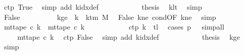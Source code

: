 \begin{isabellebody}
\ c{}{\isacharunderscore}{\kern0pt}tp\ True\ \isamarkupfalse%
\ {\isacharparenleft}{\kern0pt}simp\ add{\isacharcolon}{\kern0pt}\ k{\isacharunderscore}{\kern0pt}idx{\isacharunderscore}{\kern0pt}def{\isacharparenright}{\kern0pt}\isanewline
\ \ \ \ \ \ \ \ \isamarkupfalse%
\ \isamarkupfalse%
\ {\isacharquery}{\kern0pt}thesis\ \isamarkupfalse%
\ klt\ \isamarkupfalse%
\ simp\isanewline
\ \ \ \ \ \ \isamarkupfalse%
\isanewline
\ \ \ \ \ \ \ \ \isamarkupfalse%
\ False\isanewline
\ \ \ \ \ \ \ \ \isamarkupfalse%
\ kge{\isacharcolon}{\kern0pt}\ {\isachardoublequoteopen}{\isasymnot}\ k\ {\isacharless}{\kern0pt}\ k{\isacharunderscore}{\kern0pt}tm\ M{\isachardoublequoteclose}\ \isamarkupfalse%
\ False\ kne\ cond{\isacharbrackleft}{\kern0pt}OF\ kne{\isacharbrackright}{\kern0pt}\ \isamarkupfalse%
\ simp\isanewline
\ \ \ \ \ \ \ \ \isamarkupfalse%
\ {\isachardoublequoteopen}mt{\isacharunderscore}{\kern0pt}tape\ c{}\ k\ {\isacharequal}{\kern0pt}\ mt{\isacharunderscore}{\kern0pt}tape\ c{}\ k{\isachardoublequoteclose}\isanewline
\ \ \ \ \ \ \ \ \ \ \isamarkupfalse%
\ c{}{\isacharunderscore}{\kern0pt}tp\ {\isacartoucheopen}k\ {\isasymnoteq}\ {\isacharquery}{\kern0pt}tl{\isacartoucheclose}\ \isamarkupfalse%
\ {\isacharparenleft}{\kern0pt}cases\ {\isachardoublequoteopen}{\isacharquery}{\kern0pt}p\ {\isacharequal}{\kern0pt}\ {}{\isachardoublequoteclose}{\isacharparenright}{\kern0pt}\ simp{\isacharunderscore}{\kern0pt}all\isanewline
\ \ \ \ \ \ \ \ \isamarkupfalse%
\ \isamarkupfalse%
\ {\isachardoublequoteopen}{\isasymdots}\ {\isacharequal}{\kern0pt}\ mt{\isacharunderscore}{\kern0pt}tape\ c{}\ k{\isachardoublequoteclose}\ \isamarkupfalse%
\ c{}{\isacharunderscore}{\kern0pt}tp\ False\ \isamarkupfalse%
\ {\isacharparenleft}{\kern0pt}simp\ add{\isacharcolon}{\kern0pt}\ k{\isacharunderscore}{\kern0pt}idx{\isacharunderscore}{\kern0pt}def{\isacharparenright}{\kern0pt}\isanewline
\ \ \ \ \ \ \ \ \isamarkupfalse%
\ \isamarkupfalse%
\ {\isacharquery}{\kern0pt}thesis\ \isamarkupfalse%
\ kge\ \isamarkupfalse%
\ simp\isanewline
\ \ \ \ \ \ \isamarkupfalse%
\isanewline
\ \ \ \ \isamarkupfalse%

\end{isabellebody}
